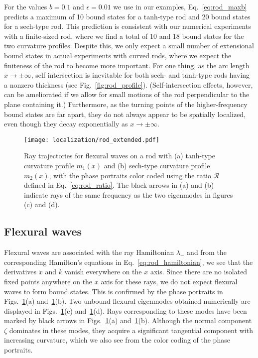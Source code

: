 For the values $b = 0.1$ and $\epsilon = 0.01$ we use in our examples, Eq.~\eqref{eq:rod_maxb} predicts a maximum of 10 bound states for a tanh-type rod and 20 bound states for a sech-type rod.
This prediction is consistent with our numerical experiments with a finite-sized rod, where we find a total of 10 and 18 bound states for the two curvature profiles.
Despite this, we only expect a small number of extensional bound states in actual experiments with curved rods, where we expect the finiteness of the rod to become more important.
For one thing, as the arc length $x \to \pm\infty$, self intersection is inevitable for both sech- and tanh-type rods having a nonzero thickness (see Fig.~\ref{fig:rod_profile}).
(Self-intersection effects, however, can be ameliorated if we allow for small motions of the rod perpendicular to the plane containing it.)
Furthermore, as the turning points of the higher-frequency bound states are far apart, they do not always appear to be spatially localized, even though they decay exponentially as $x \to \pm\infty$.
%
\begin{figure}
  \begin{center}
    \texttt{[image: localization/rod\_extended.pdf]}
  \end{center}
  \caption{%
    Ray trajectories for flexural waves on a rod with (a) tanh-type curvature profile $m_{1}(x)$ and (b) sech-type curvature profile $m_{2}(x)$, with the phase portraits color coded using the ratio $\mathscr{R}$ defined in Eq.~\eqref{eq:rod_ratio}.
    The black arrows in (a) and (b) indicate rays of the same frequency as the two eigenmodes in figures (c) and (d).
  }
  \label{fig:rod_extended}
\end{figure}

\subsection{Flexural waves}

Flexural waves are associated with the ray Hamiltonian $\lambda_{-}$ and from the corresponding Hamilton's equations in Eq.~\eqref{eq:rod_hamiltonian}, we see that the derivatives $\dot{x}$ and $\dot{k}$ vanish everywhere on the $x$ axis.
Since there are no isolated fixed points anywhere on the $x$ axis for these rays, we do not expect flexural waves to form bound states.
This is confirmed by the phase portraits in Figs.~\ref{fig:rod_extended}(a) and~\ref{fig:rod_extended}(b).
%
Two unbound flexural eigenmodes obtained numerically are displayed in Figs.~\ref{fig:rod_extended}(c) and~\ref{fig:rod_extended}(d).
Rays corresponding to these modes have been marked by black arrows in Figs.~\ref{fig:rod_extended}(a) and~\ref{fig:rod_extended}(b).
Although the normal component $\zeta$ dominates in these modes, they acquire a significant tangential component with increasing curvature, which we also see from the color coding of the phase portraits.

